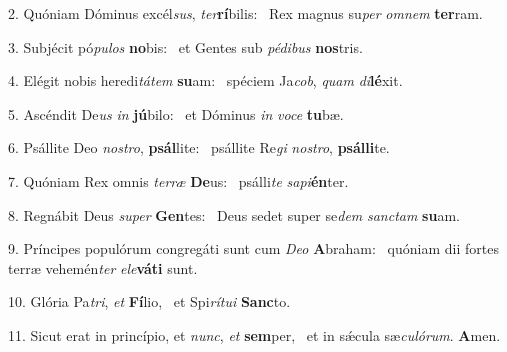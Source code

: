 2. Quóniam Dóminus excél\textit{sus}, \textit{ter}\textbf{rí}bilis: \ast\  Rex magnus su\textit{per} \textit{om}\textit{nem} \textbf{ter}ram.\

3. Subjécit pó\textit{pu}\textit{los} \textbf{no}bis: \ast\  et Gentes sub \textit{pé}\textit{di}\textit{bus} \textbf{nos}tris.\

4. Elégit nobis heredi\textit{tá}\textit{tem} \textbf{su}am: \ast\  spéciem Ja\textit{cob}, \textit{quam} \textit{di}\textbf{lé}xit.\

5. Ascéndit De\textit{us} \textit{in} \textbf{jú}bilo: \ast\  et Dóminus \textit{in} \textit{vo}\textit{ce} \textbf{tu}bæ.\

6. Psállite Deo \textit{nos}\textit{tro}, \textbf{psál}lite: \ast\  psállite Re\textit{gi} \textit{nos}\textit{tro}, \textbf{psál}\textbf{li}te.\

7. Quóniam Rex omnis \textit{ter}\textit{ræ} \textbf{De}us: \ast\  psálli\textit{te} \textit{sa}\textit{pi}\textbf{én}ter.\

8. Regnábit Deus \textit{su}\textit{per} \textbf{Gen}tes: \ast\  Deus sedet super se\textit{dem} \textit{sanc}\textit{tam} \textbf{su}am.\

9. Príncipes populórum congregáti sunt cum \textit{De}\textit{o} \textbf{A}braham: \ast\  quóniam dii fortes terræ vehemén\textit{ter} \textit{e}\textit{le}\textbf{vá}\textbf{ti} sunt.\

10. Glória Pa\textit{tri}, \textit{et} \textbf{Fí}lio, \ast\  et Spi\textit{rí}\textit{tu}\textit{i} \textbf{Sanc}to.\

11. Sicut erat in princípio, et \textit{nunc}, \textit{et} \textbf{sem}per, \ast\  et in sǽcula sæ\textit{cu}\textit{ló}\textit{rum}. \textbf{A}men.\

